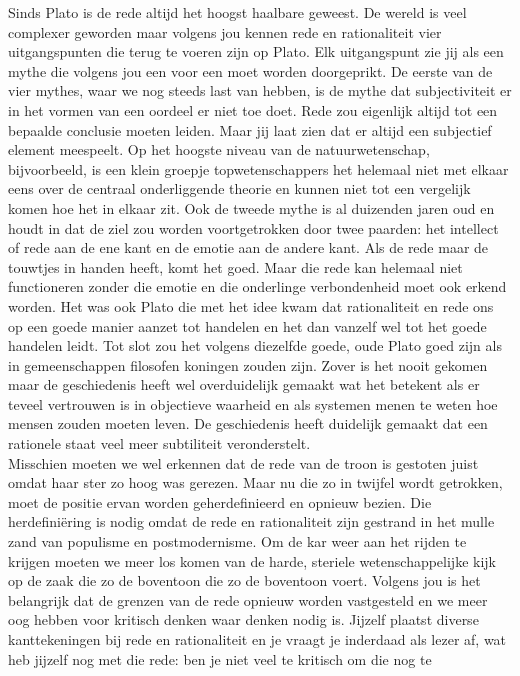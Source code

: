 \documentclass[]{book}
\begin{document}
Sinds Plato is de rede altijd het hoogst haalbare geweest. De wereld is
veel complexer geworden maar volgens jou kennen rede en rationaliteit
vier uitgangspunten die terug te voeren zijn op Plato. Elk uitgangspunt
zie jij als een mythe die volgens jou een voor een moet worden
doorgeprikt. De eerste van de vier mythes, waar we nog steeds last van
hebben, is de mythe dat subjectiviteit er in het vormen van een oordeel
er niet toe doet. Rede zou eigenlijk altijd tot een bepaalde conclusie
moeten leiden. Maar jij laat zien dat er altijd een subjectief element
meespeelt. Op het hoogste niveau van de natuurwetenschap, bijvoorbeeld,
is een klein groepje topwetenschappers het helemaal niet met elkaar eens
over de centraal onderliggende theorie en kunnen niet tot een vergelijk
komen hoe het in elkaar zit. Ook de tweede mythe is al duizenden jaren
oud en houdt in dat de ziel zou worden voortgetrokken door twee paarden:
het intellect of rede aan de ene kant en de emotie aan de andere kant.
Als de rede maar de touwtjes in handen heeft, komt het goed. Maar die
rede kan helemaal niet functioneren zonder die emotie en die onderlinge
verbondenheid moet ook erkend worden. Het was ook Plato die met het idee
kwam dat rationaliteit en rede ons op een goede manier aanzet tot
handelen en het dan vanzelf wel tot het goede handelen leidt. Tot slot
zou het volgens diezelfde goede, oude Plato goed zijn als in
gemeenschappen filosofen koningen zouden zijn. Zover is het nooit
gekomen maar de geschiedenis heeft wel overduidelijk gemaakt wat het
betekent als er teveel vertrouwen is in objectieve waarheid en als
systemen menen te weten hoe mensen zouden moeten leven. De geschiedenis
heeft duidelijk gemaakt dat een rationele staat veel meer subtiliteit
veronderstelt.\\
Misschien moeten we wel erkennen dat de rede van de troon is gestoten
juist omdat haar ster zo hoog was gerezen. Maar nu die zo in twijfel
wordt getrokken, moet de positie ervan worden geherdefinieerd en opnieuw
bezien. Die herdefiniëring is nodig omdat de rede en rationaliteit zijn
gestrand in het mulle zand van populisme en postmodernisme. Om de kar
weer aan het rijden te krijgen moeten we meer los komen van de harde,
steriele wetenschappelijke kijk op de zaak die zo de boventoon die zo de
boventoon voert. Volgens jou is het belangrijk dat de grenzen van de
rede opnieuw worden vastgesteld en we meer oog hebben voor kritisch
denken waar denken nodig is. Jijzelf plaatst diverse kanttekeningen bij
rede en rationaliteit en je vraagt je inderdaad als lezer af, wat heb
jijzelf nog met die rede: ben je niet veel te kritisch om die nog te
\end{document}
